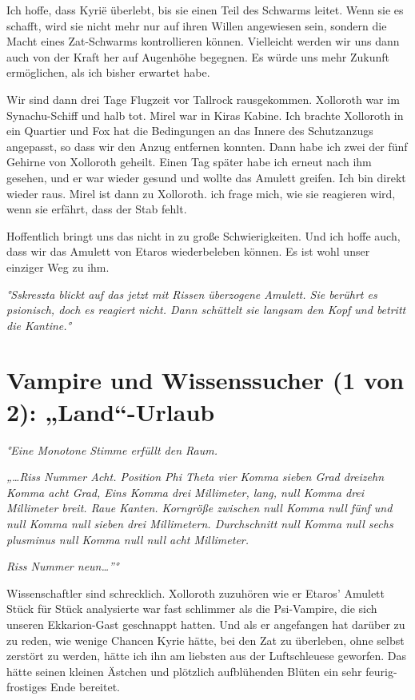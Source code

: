 \documentclass[11pt]{scrartcl}
\begin{document}
Ich hoffe, dass Kyrië überlebt, bis sie einen Teil des Schwarms leitet.
Wenn sie es schafft, wird sie nicht mehr nur auf ihren Willen angewiesen
sein, sondern die Macht eines Zat-Schwarms kontrollieren können.
Vielleicht werden wir uns dann auch von der Kraft her auf Augenhöhe
begegnen. Es würde uns mehr Zukunft ermöglichen, als ich bisher erwartet
habe.

Wir sind dann drei Tage Flugzeit vor Tallrock rausgekommen. Xolloroth
war im Synachu-Schiff und halb tot. Mirel war in Kiras Kabine. Ich
brachte Xolloroth in ein Quartier und Fox hat die Bedingungen an das
Innere des Schutzanzugs angepasst, so dass wir den Anzug entfernen
konnten. Dann habe ich zwei der fünf Gehirne von Xolloroth geheilt.
Einen Tag später habe ich erneut nach ihm gesehen, und er war wieder
gesund und wollte das Amulett greifen. Ich bin direkt wieder raus. Mirel
ist dann zu Xolloroth. ich frage mich, wie sie reagieren wird, wenn sie
erfährt, dass der Stab fehlt.

Hoffentlich bringt uns das nicht in zu große Schwierigkeiten. Und ich
hoffe auch, dass wir das Amulett von Etaros wiederbeleben können. Es ist
wohl unser einziger Weg zu ihm.

\emph{°Sskreszta blickt auf das jetzt mit Rissen überzogene Amulett. Sie
berührt es psionisch, doch es reagiert nicht. Dann schüttelt sie langsam
den Kopf und betritt die Kantine.°}

\section{Vampire und Wissenssucher (1 von 2): „Land``-Urlaub}

\emph{°Eine Monotone Stimme erfüllt den Raum.}

\emph{„\ldots{}Riss Nummer Acht. Position Phi Theta vier Komma sieben
Grad dreizehn Komma acht Grad, Eins Komma drei Millimeter, lang, null
Komma drei Millimeter breit. Raue Kanten. Korngröße zwischen null Komma
null fünf und null Komma null sieben drei Millimetern. Durchschnitt null
Komma null sechs plusminus null Komma null null acht Millimeter.}

\emph{Riss Nummer neun\ldots{}''°}

Wissenschaftler sind schrecklich. Xolloroth zuzuhören wie er Etaros'
Amulett Stück für Stück analysierte war fast schlimmer als die
Psi-Vampire, die sich unseren Ekkarion-Gast geschnappt hatten. Und als
er angefangen hat darüber zu zu reden, wie wenige Chancen Kyrie hätte,
bei den Zat zu überleben, ohne selbst zerstört zu werden, hätte ich ihn
am liebsten aus der Luftschleuese geworfen. Das hätte seinen kleinen
Ästchen und plötzlich aufblühenden Blüten ein sehr feurig-frostiges Ende
bereitet.
\end{document}
